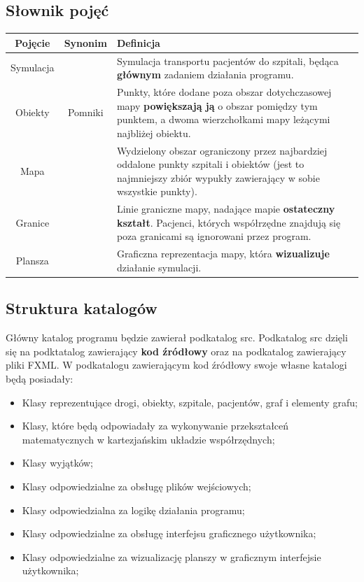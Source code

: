 \documentclass{article}
\begin{document}
    \subsection{Słownik pojęć}
    \begin{center}
         \begin{tabular}{|c|c|L|}
            \hline
                Pojęcie & Synonim & Definicja \\
            \hline
                Symulacja && Symulacja transportu pacjentów do szpitali, będąca \textbf{głównym} zadaniem działania programu. \\
            \hline
                Obiekty & Pomniki & Punkty, które dodane poza obszar dotychczasowej mapy \textbf{powiększają ją} o obszar pomiędzy tym punktem, a dwoma wierzchołkami mapy leżącymi najbliżej obiektu. \\
            \hline
                Mapa && Wydzielony obszar ograniczony przez najbardziej oddalone punkty szpitali i obiektów (jest to najmniejszy zbiór wypukły zawierający w sobie wszystkie punkty).\\
            \hline
                Granice && Linie graniczne mapy, nadające mapie \textbf{ostateczny kształt}. Pacjenci, których współrzędne znajdują się poza granicami są ignorowani przez program. \\
            \hline
                Plansza && Graficzna reprezentacja mapy, która \textbf{wizualizuje} działanie symulacji. \\
            \hline
        \end{tabular}
    \end{center}

    \subsection{Struktura katalogów}

    Główny katalog programu będzie zawierał podkatalog src. Podkatalog src dzięli się na podktatalog zawierający \textbf{kod źródłowy} oraz na podkatalog zawierający pliki FXML. W podkatalogu zawierającym kod źródłowy swoje własne katalogi będą posiadały:
    \begin{itemize}
        \item Klasy reprezentujące drogi, obiekty, szpitale, pacjentów, graf i elementy grafu;
        \item Klasy, które będą odpowiadały za wykonywanie przekształceń matematycznych w kartezjańskim układzie współrzędnych;
        \item Klasy wyjątków;
        \item Klasy odpowiedzialne za obsługę plików wejściowych;
        \item Klasy odpowiedzialna za logikę działania programu;
        \item Klasy odpowiedzialne za obsługę interfejsu graficznego użytkownika;
        \item Klasy odpowiedzialne za wizualizację planszy w graficznym interfejsie użytkownika;

    \end{itemize}
\end{document}
